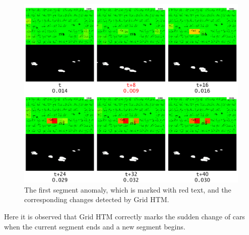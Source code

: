 \begin{figure}[H]
    \centering
    \includegraphics[width=\textwidth]{resources/experiments/surveillance/surveillance_anomaly_1.png}
    \caption[Segment Anomaly]{The first segment anomaly, which is marked with red text,  and the corresponding changes detected by Grid HTM.}
    \label{fig:surveillance_segment}
\end{figure}
Here it is observed that Grid HTM correctly marks the sudden change of cars when the current segment ends and a new segment begins.
